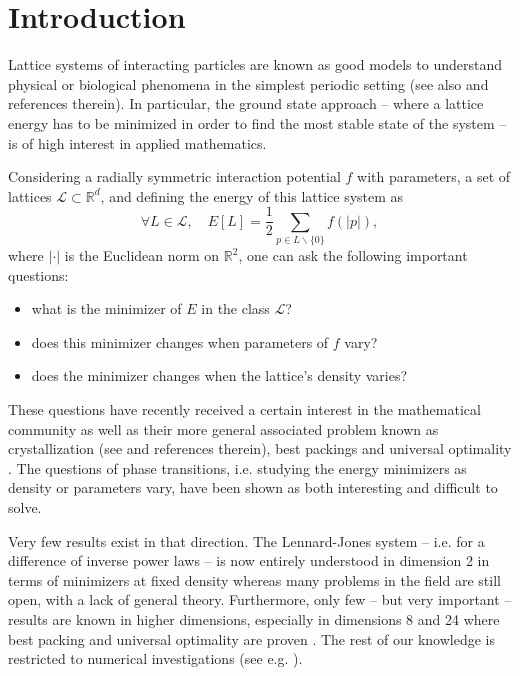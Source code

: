 \documentclass[12pt]{interact}
\theoremstyle{definition}
\newcommand{\R}{\mathbb R}
\begin{document}
\renewcommand{\theequation}{1.\arabic{equation}}
\setcounter{equation}{0}

\section{Introduction} \label{Sec1}

\renewcommand{\theequation}{2.\arabic{equation}}
\setcounter{equation}{0}

Lattice systems of interacting particles are known as good models
to understand physical
\cite{Bet16,BetFriedStefEAM21,LuoRenWei20,LuoWei22,SandSerf12} or biological
\cite{Betgrid21,Mogilner03} phenomena in the simplest periodic setting
(see also \cite{BlancLewin15} and references therein).
In particular, the ground state approach -- where a lattice energy has
to be minimized in order to find the most stable state of the system --
is of high interest in applied mathematics.

\medskip

Considering a radially symmetric interaction potential $f$ with parameters, a set of lattices $\mathcal{L}\subset \R^d$, and defining the energy of this lattice system as
$$
\forall L\in \mathcal{L},\quad  E[L]=\frac{1}{2}\sum_{p\in L\backslash\{0\}} f(|p|),
$$
where $|\cdot|$ is the Euclidean norm on $\R^2$, one can ask the following important questions:
\begin{itemize}
\item[•] what is the minimizer of $E$ in the class $\mathcal{L}$?
\item[•] does this minimizer changes when parameters of $f$ vary?
\item[•] does the minimizer changes when the lattice's density varies? 
\end{itemize}

These questions have recently received a certain interest in the mathematical
community \cite{Bet16,BetPetrache19,BetFriedStefEAM21,LuoWeiLJ22,LuoWei23}
as well as their more general associated problem known as crystallization
(see \cite{BetLucPet21} and references therein), best packings
\cite{Viazetal17,Viaz17} and universal optimality \cite{CohnKumar07,Viazetal22}.
The questions of phase transitions, i.e. studying the energy minimizers
as density or parameters vary, have been shown as both interesting
\cite{Bet18,SamajTravenec19} and difficult
\cite{BetSamTrav23,LuoWeiLJ22} to solve.

\medskip

Very few results exist in that direction.
The Lennard-Jones system -- i.e. for a difference of inverse power laws --
is now entirely understood in dimension 2 \cite{Bet23,LuoWeiLJ22} in terms
of minimizers at fixed density whereas many problems in the field are still
open, with a lack of general theory.
Furthermore, only few -- but very important -- results are known
in higher dimensions, especially in dimensions 8 and 24 where best packing and
universal optimality are proven \cite{BetDefects21,Viazetal22}.
The rest of our knowledge is restricted to numerical investigations
(see e.g. \cite{BetSamTrav23}).
\end{document}
